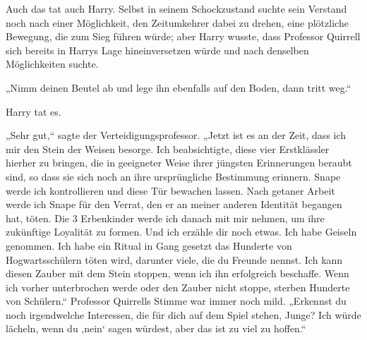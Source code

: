 Auch das tat auch Harry.
Selbst in seinem Schockzustand suchte sein Verstand noch nach einer Möglichkeit, den Zeitumkehrer dabei zu drehen, eine plötzliche Bewegung, die zum Sieg führen würde; aber Harry wusste, dass Professor Quirrell sich bereits in Harrys Lage hineinversetzen würde und nach denselben Möglichkeiten suchte.

„Nimm deinen Beutel ab und lege ihn ebenfalls auf den Boden, dann tritt weg.“

Harry tat es.

„Sehr gut,“ sagte der Verteidigungsprofessor. „Jetzt ist es an der Zeit, dass ich mir den Stein der Weisen besorge. Ich beabsichtigte, diese vier Erstklässler hierher zu bringen, die in geeigneter Weise ihrer jüngsten Erinnerungen beraubt sind, so dass sie sich noch an ihre ursprüngliche Bestimmung erinnern. Snape werde ich kontrollieren und diese Tür bewachen lassen. Nach getaner Arbeit werde ich Snape für den Verrat, den er an meiner anderen Identität begangen hat, töten. Die 3 Erbenkinder werde ich danach mit mir nehmen, um ihre zukünftige Loyalität zu formen. Und ich erzähle dir noch etwas. Ich habe Geiseln genommen. Ich habe ein Ritual in Gang gesetzt das Hunderte von Hogwartsschülern töten wird, darunter viele, die du Freunde nennst. Ich kann diesen Zauber mit dem Stein stoppen, wenn ich ihn erfolgreich beschaffe. Wenn ich vorher unterbrochen werde oder den Zauber nicht stoppe, sterben Hunderte von Schülern.“
Professor Quirrells Stimme war immer noch mild.
„Erkennst du noch irgendwelche Interessen, die für dich auf dem Spiel stehen, Junge? Ich würde lächeln, wenn du ‚nein‘ sagen würdest, aber das ist zu viel zu hoffen.“

